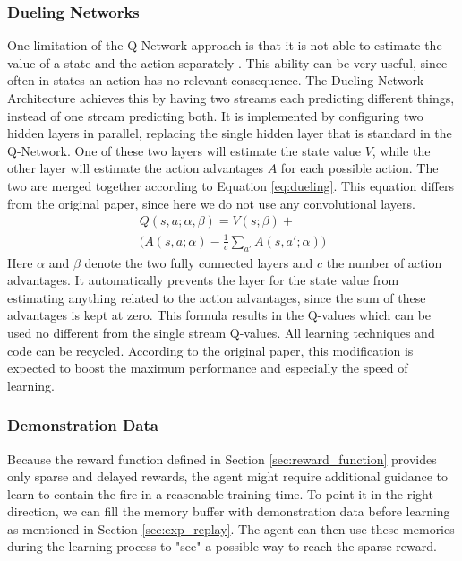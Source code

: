\subsubsection{Dueling Networks}\label{sec:dueling}
One limitation of the Q-Network approach is that it is not able to estimate the value of a state and the action separately \citep{wang2015dueling}. This ability can be very useful, since often in states an action has no relevant consequence. The Dueling Network Architecture achieves this by having two streams each predicting different things, instead of one stream predicting both. It is implemented by configuring two hidden layers in parallel, replacing the single hidden layer that is standard in the Q-Network. One of these two layers will estimate the state value $V$, while the other layer will estimate the action advantages $A$ for each possible action. The two are merged together according to Equation \eqref{eq:dueling}. This equation differs from the original paper, since here we do not use any convolutional layers.
\begin{equation} \label{eq:dueling}
  \begin{array}{l}
    Q(s,a; \alpha, \beta) = V(s; \beta) + \\ 
    \Big(A(s, a; \alpha) - \frac{1}{c} \sum\limits_{a'} A(s,a'; \alpha)\Big)
  \end{array}
\end{equation}
Here $\alpha$ and $\beta$ denote the two fully connected layers and $c$ the number of action advantages. It automatically prevents the layer for the state value from estimating anything related to the action advantages, since the sum of these advantages is kept at zero. This formula results in the Q-values which can be used no different from the single stream Q-values. All learning techniques and code can be recycled. According to the original paper, this modification is expected to boost the maximum performance and especially the speed of learning. 



\subsubsection{Demonstration Data}\label{sec:demo_data}
Because the reward function defined in Section \ref{sec:reward_function} provides only sparse and delayed rewards, the agent might require additional guidance to learn to contain the fire in a reasonable training time. To point it in the right direction, we can fill the memory buffer with demonstration data before learning as mentioned in Section \ref{sec:exp_replay}. The agent can then use these memories during the learning process to "see" a possible way to reach the sparse reward.

